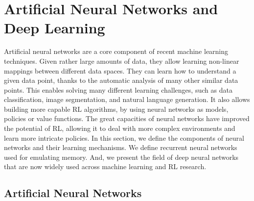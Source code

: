 


\section{Artificial Neural Networks and Deep Learning}\label{sec:NNs}

Artificial neural networks are a core component of recent machine learning techniques. Given rather large amounts of data, they allow learning non-linear mappings between different data spaces. They can learn how to understand a given data point, thanks to the automatic analysis of many other similar data points. This enables solving many different learning challenges, such as data classification, image segmentation, and natural language generation. It also allows building more capable RL algorithms, by using neural networks as models, policies or value functions. The great capacities of neural networks have improved the potential of RL, allowing it to deal with more complex environments and learn more intricate policies. In this section, we define the components of neural networks and their learning mechanisms. We define recurrent neural networks used for emulating memory. And, we present the field of deep neural networks that are now widely used across machine learning and RL research. 


\subsection{Artificial Neural Networks}\label{sec:NN:ANN}

